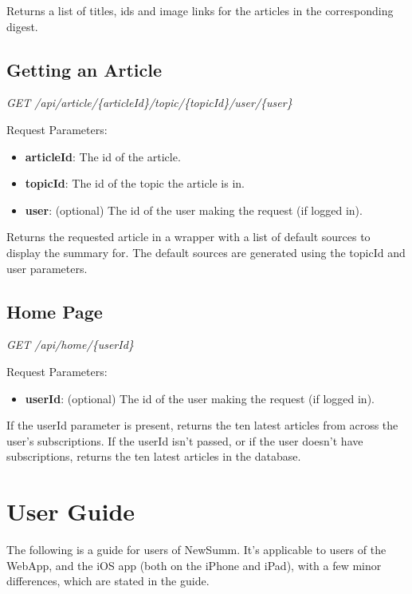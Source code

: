 \documentclass[12pt]{article}
\begin{document}
\begin{appendices}
Returns a list of titles, ids and image links for the articles in the corresponding digest.

\subsection{Getting an Article}

\emph{GET	/api/article/\{articleId\}/topic/\{topicId\}/user/\{user\}}

Request Parameters:
\begin{itemize}
	\item \textbf{articleId}: The id of the article.
	\item \textbf{topicId}: The id of the topic the article is in.
	\item \textbf{user}: (optional) The id of the user making the request (if logged in).
\end{itemize}

Returns the requested article in a wrapper with a list of default sources to display the summary for. The default sources are generated using the topicId and user parameters. 

\subsection{Home Page}

\emph{GET	/api/home/\{userId\}}

Request Parameters:
\begin{itemize}
	\item \textbf{userId}: (optional) The id of the user making the request (if logged in).
\end{itemize}

If the userId parameter is present, returns the ten latest articles from across the user's subscriptions. If the userId isn't passed, or if the user doesn't have subscriptions, returns the ten latest articles in the database.


\newpage

\section{User Guide}

\label{userguide}

The following is a guide for users of NewSumm. It's applicable to users of the WebApp, and the iOS app (both on the iPhone and iPad), with a few minor differences, which are stated in the guide.


\end{appendices}
\end{document}
